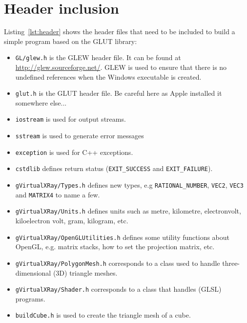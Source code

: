 \documentclass[11pt,oneside,a4paper,final]{article}
\begin{document}
\section{Header inclusion}
\label{sec:Header inclusion}

Listing~\ref{lst:header} shows 
 the header files that need to be included to 
build a simple program based on the GLUT 
library:
\begin{itemize}
 \item \verb+GL/glew.h+ is the GLEW header file. It can be found at 
  \url{http://glew.sourceforge.net/}. GLEW is used to ensure that there is no 
  undefined references when the Windows executable is created.
 \item \verb+glut.h+ is the GLUT header file. Be careful here as Apple installed it somewhere else... 
 \item \verb+iostream+ is used for output streams.
 \item \verb+sstream+ is used to generate error messages
 \item \verb+exception+ is used for C++ exceptions.
 \item \verb+cstdlib+ defines return status (\verb+EXIT_SUCCESS+ and 
	\verb+EXIT_FAILURE+).
 \item \verb+gVirtualXRay/Types.h+ defines new types, e.g 
\verb+RATIONAL_NUMBER+, 
	\verb+VEC2+, \verb+VEC3+ and \verb+MATRIX4+ to name a few.
 \item \verb+gVirtualXRay/Units.h+ defines units such as metre, kilometre, 
electronvolt, 
	kiloelectron volt, gram, kilogram, etc.
 \item \verb+gVirtualXRay/OpenGLUtilities.h+ defines some utility functions 
about OpenGL, 
	e.g. matrix stacks, how to set the projection matrix, etc.
 \item \verb+gVirtualXRay/PolygonMesh.h+ corresponds to a class used to handle 
three-dimensional (3D) triangle meshes.
 \item \verb+gVirtualXRay/Shader.h+ corresponds to a class that handles 
(GLSL) programs.
 \item \verb+buildCube.h+ is used to create the triangle mesh of a cube.
\end{itemize}

\begin{center}

\end{center}
\end{document}
